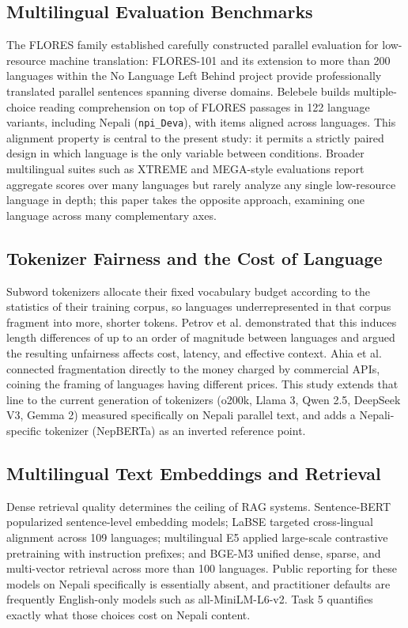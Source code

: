 \documentclass[conference]{IEEEtran}
\begin{document}
\subsection{Multilingual Evaluation Benchmarks}
The FLORES family established carefully constructed parallel evaluation for low-resource machine translation: FLORES-101 \cite{goyal2022flores} and its extension to more than 200 languages within the No Language Left Behind project \cite{nllb2022} provide professionally translated parallel sentences spanning diverse domains. Belebele \cite{bandarkar2024belebele} builds multiple-choice reading comprehension on top of FLORES passages in 122 language variants, including Nepali (\texttt{npi\_Deva}), with items aligned across languages. This alignment property is central to the present study: it permits a strictly paired design in which language is the only variable between conditions. Broader multilingual suites such as XTREME and MEGA-style evaluations report aggregate scores over many languages but rarely analyze any single low-resource language in depth; this paper takes the opposite approach, examining one language across many complementary axes.

\subsection{Tokenizer Fairness and the Cost of Language}
Subword tokenizers allocate their fixed vocabulary budget according to the statistics of their training corpus, so languages underrepresented in that corpus fragment into more, shorter tokens. Petrov et al. \cite{petrov2023tokenizers} demonstrated that this induces length differences of up to an order of magnitude between languages and argued the resulting unfairness affects cost, latency, and effective context. Ahia et al. \cite{ahia2023cost} connected fragmentation directly to the money charged by commercial APIs, coining the framing of languages having different prices. This study extends that line to the current generation of tokenizers (o200k, Llama 3, Qwen 2.5, DeepSeek V3, Gemma 2) measured specifically on Nepali parallel text, and adds a Nepali-specific tokenizer (NepBERTa) as an inverted reference point.

\subsection{Multilingual Text Embeddings and Retrieval}
Dense retrieval quality determines the ceiling of RAG systems. Sentence-BERT \cite{reimers2019sbert} popularized sentence-level embedding models; LaBSE \cite{feng2022labse} targeted cross-lingual alignment across 109 languages; multilingual E5 \cite{wang2024e5} applied large-scale contrastive pretraining with instruction prefixes; and BGE-M3 \cite{chen2024bgem3} unified dense, sparse, and multi-vector retrieval across more than 100 languages. Public reporting for these models on Nepali specifically is essentially absent, and practitioner defaults are frequently English-only models such as all-MiniLM-L6-v2. Task 5 quantifies exactly what those choices cost on Nepali content.
\end{document}
